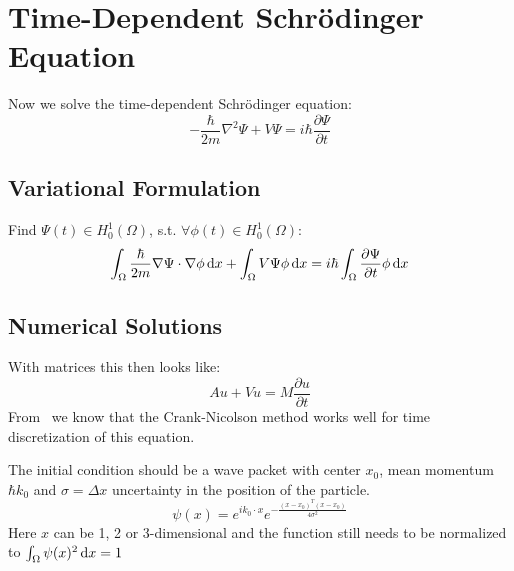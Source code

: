 \documentclass[a4paper,11pt]{scrartcl}
\newcommand*{\dx}{\dif{}x}
\begin{document}
\section{Time-Dependent Schrödinger Equation}
Now we solve the time-dependent Schrödinger equation:
\[ -\frac{\hbar}{2m} \nabla^2 \Psi + V \Psi = i \hbar \frac{\partial\Psi}{\partial{}t}\]

\subsection{Variational Formulation}

Find $\Psi(t) \in H^1_0(\Omega)$, s.t. $\forall \phi(t) \in H^1_0(\Omega)$:
\[ \int_{\Omega} \frac{\hbar}{2m} \nabla \Psi \cdot \nabla\phi \dx +
  \int_{\Omega} V \Psi \phi\dx = i \hbar\int_{\Omega}
  \frac{\partial\Psi}{\partial{}t} \phi\dx\]

\subsection{Numerical Solutions}
With matrices this then looks like:
\[A u + V u = M \frac{\partial{}u}{\partial{}t}\]
From~\cite{Sehra07} we know that the Crank-Nicolson method works well for time
discretization of this equation.\nocite{itutorial}

The initial condition should be a wave packet with center $x_0$, mean momentum
$\hbar k_0$ and $\sigma = \Delta x$ uncertainty in the position of the particle.
\[\psi(x) =  e^{ik_0\cdot x}e^{-\frac{(x-x_0)^T(x-x_0)}{4\sigma^2}}\]
Here $x$ can be 1, 2 or 3-dimensional and the function still needs to be
normalized to $\int_{\Omega}\psi(x)^2\dx = 1$

{}

\end{document}
